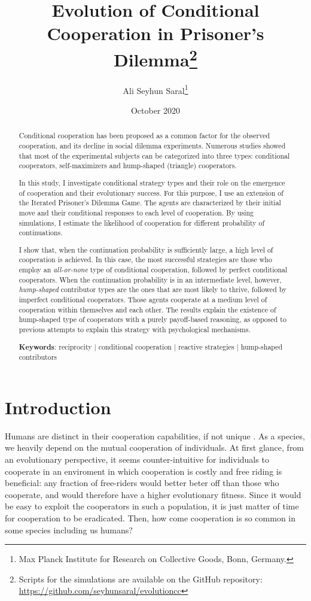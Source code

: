 \documentclass[12pt]{article}
\title{Evolution of Conditional Cooperation in Prisoner's Dilemma\footnote{Scripts for the simulations are available on the GitHub repository: \url{https://github.com/seyhunsaral/evolutioncc}}}
\author{Ali Seyhun Saral\thanks{Max Planck Institute for Research on Collective Goods, Bonn, Germany.}}
\date{October 2020}
\begin{document}
\onehalfspacing
\sloppy
\maketitle        
\begin{abstract}

\thispagestyle{plain}

Conditional cooperation has been proposed as a common factor for the observed cooperation, and its decline in social dilemma experiments. Numerous studies showed that most of the experimental subjects can be categorized into three types: conditional cooperators, self-maximizers and hump-shaped (triangle) cooperators. 

In this study, I investigate conditional strategy types and their role on the emergence of cooperation and their evolutionary success. For this purpose, I use an extension of the Iterated Prisoner's Dilemma Game. The agents are characterized by their initial move and their conditional responses to each level of cooperation. By using simulations, I estimate the likelihood of cooperation for different probability of continuations.

I show that, when the continuation probability is sufficiently large, a high level of cooperation is achieved. In this case, the most successful strategies are those who employ an \textit{all-or-none} type of conditional cooperation, followed by perfect conditional cooperators. When the continuation probability is in an intermediate level, however, \textit{hump-shaped} contributor types are the ones that are most likely to thrive, followed by imperfect conditional cooperators. Those agents cooperate at a medium level of cooperation within themselves and each other. The results explain the existence of hump-shaped type of cooperators with a purely payoff-based reasoning, as opposed to previous attempts to explain this strategy with psychological mechanisms. 

\textbf{Keywords}: reciprocity | conditional cooperation | reactive strategies | hump-shaped contributors 
\end{abstract}

\section*{Introduction} 
Humans are distinct in their cooperation capabilities, if not unique \citep[See][]{Bowles2011,Wilson2012}. As a species, we heavily depend on the mutual cooperation of individuals. At first glance, from an evolutionary perspective, it seems counter-intuitive for individuals to cooperate in an enviroment in which cooperation is costly and free riding is beneficial: any fraction of free-riders would better beter off than those who cooperate, and would therefore have a higher evolutionary fitness. Since it would be easy to exploit the cooperators in such a population, it is just matter of time for cooperation to be eradicated. Then, how come cooperation is so common in some species including us humans?
\end{document}
